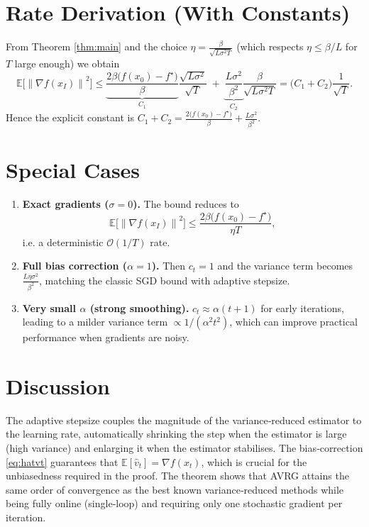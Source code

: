 \documentclass{article}
\newcommand{\E}{\mathbb{E}}
\newcommand{\norm}[1]{\left\lVert#1\right\rVert}
\begin{document}
\section*{Rate Derivation (With Constants)}
From Theorem \ref{thm:main} and the choice $\displaystyle\eta = \frac{\beta}{\sqrt{L\sigma^{2}T}}$ (which respects $\eta\le\beta/L$ for $T$ large enough) we obtain
\[
\E\!\big[\norm{\nabla f(x_I)}^{2}\big]
\le
\underbrace{\frac{2\beta\big(f(x_0)-f^\star\big)}{\beta}}_{C_1}
\frac{\sqrt{L\sigma^{2}}}{\sqrt{T}}
\;+\;
\underbrace{\frac{L\sigma^{2}}{\beta^{2}}}_{C_2}
\frac{\beta}{\sqrt{L\sigma^{2}T}}
=
\big(C_1+C_2\big)\frac{1}{\sqrt{T}} .
\]
Hence the explicit constant is $C_1+C_2= \frac{2\big(f(x_0)-f^\star\big)}{\beta}+ \frac{L\sigma^{2}}{\beta^{2}}$.

\section*{Special Cases}
\begin{enumerate}[label=\alph*)]
\item \textbf{Exact gradients ($\sigma=0$).} The bound reduces to
\[
\E\!\big[\norm{\nabla f(x_I)}^{2}\big]\le\frac{2\beta\big(f(x_0)-f^\star\big)}{\eta T},
\]
i.e. a deterministic $\mathcal{O}(1/T)$ rate.
\item \textbf{Full bias correction ($\alpha=1$).} Then $c_t=1$ and the variance term becomes $\frac{L\eta\sigma^{2}}{\beta^{2}}$, matching the classic SGD bound with adaptive stepsize.
\item \textbf{Very small $\alpha$ (strong smoothing).} $c_t\approx\alpha(t+1)$ for early iterations, leading to a milder variance term $\propto 1/(\alpha^{2}t^{2})$, which can improve practical performance when gradients are noisy.
\end{enumerate}

\section*{Discussion}
The adaptive stepsize couples the magnitude of the variance‑reduced estimator to the learning rate, automatically shrinking the step when the estimator is large (high variance) and enlarging it when the estimator stabilises. The bias‑correction \eqref{eq:hatvt} guarantees that $\E[\hat v_t]=\nabla f(x_t)$, which is crucial for the unbiasedness required in the proof. The theorem shows that AVRG attains the same order of convergence as the best known variance‑reduced methods while being fully online (single‑loop) and requiring only one stochastic gradient per iteration.
\end{document}
